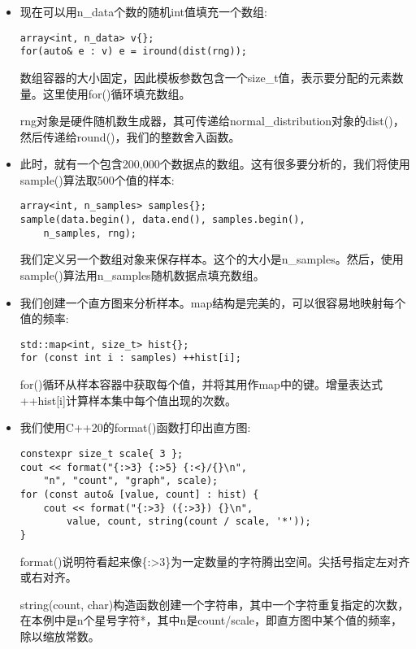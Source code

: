 \begin{itemize}
\item 
现在可以用n\_data个数的随机int值填充一个数组:

\begin{lstlisting}[style=styleCXX]
array<int, n_data> v{};
for(auto& e : v) e = iround(dist(rng));
\end{lstlisting}

数组容器的大小固定，因此模板参数包含一个size\_t值，表示要分配的元素数量。这里使用for()循环填充数组。

rng对象是硬件随机数生成器，其可传递给normal\_distribution对象的dist()，然后传递给round()，我们的整数舍入函数。

\item 
此时，就有一个包含200,000个数据点的数组。这有很多要分析的，我们将使用sample()算法取500个值的样本:

\begin{lstlisting}[style=styleCXX]
array<int, n_samples> samples{};
sample(data.begin(), data.end(), samples.begin(),
	n_samples, rng);
\end{lstlisting}

我们定义另一个数组对象来保存样本。这个的大小是n\_samples。然后，使用sample()算法用n\_samples随机数据点填充数组。

\item 
我们创建一个直方图来分析样本。map结构是完美的，可以很容易地映射每个值的频率:

\begin{lstlisting}[style=styleCXX]
std::map<int, size_t> hist{};
for (const int i : samples) ++hist[i];
\end{lstlisting}

for()循环从样本容器中获取每个值，并将其用作map中的键。增量表达式++hist[i]计算样本集中每个值出现的次数。

\item 
我们使用C++20的format()函数打印出直方图:

\begin{lstlisting}[style=styleCXX]
constexpr size_t scale{ 3 };
cout << format("{:>3} {:>5} {:<}/{}\n",
	"n", "count", "graph", scale);
for (const auto& [value, count] : hist) {
	cout << format("{:>3} ({:>3}) {}\n",
		value, count, string(count / scale, '*'));
}
\end{lstlisting}

format()说明符看起来像\{:>3\}为一定数量的字符腾出空间。尖括号指定左对齐或右对齐。

string(count, char)构造函数创建一个字符串，其中一个字符重复指定的次数，在本例中是n个星号字符*，其中n是count/scale，即直方图中某个值的频率，除以缩放常数。


\end{itemize}
